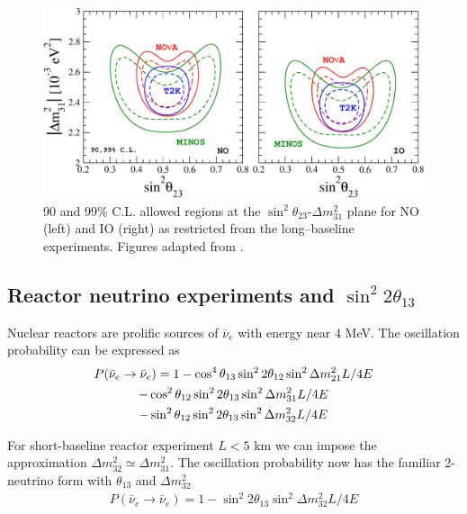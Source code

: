 \documentclass[english]{article}
\begin{document}
    \begin{figure}[!hbt]
		\begin{center}
        \centering
        \captionsetup{justification=centering}
		\includegraphics[scale=0.5]{LBL-exp.pdf}
		\caption{90 and 99\% C.L. allowed regions at the $\sin^{2}{\theta_{23}}$-$\Delta{m^{2}_{31}}$ plane for NO (left) and IO (right) as restricted from the long–baseline experiments. Figures adapted from \cite{salas2018}.}
		\label{fig:LBL-exp}
		\end{center}
	\end{figure}

\subsection{Reactor neutrino experiments and $\sin^{2}{2\theta_{13}}$}
	
    Nuclear reactors are prolific sources of $\bar{\nu}_{e}$ with energy near 4 MeV. The oscillation probability can be expressed as
    \begin{gather}
    	P(\bar{\nu}_{e} \rightarrow \bar{\nu}_{e}) = 1-\cos^{4}{\theta_{13}} \sin^{2}{2\theta_{12}} \sin^{2}{\Delta{m^{2}_{21} L/4E}}\notag \\
        -\cos^{2}{\theta_{12}} \sin^{2}{2\theta_{13}} \sin^{2}{\Delta{m^{2}_{31} L/4E}}\notag \\
        -\sin^{2}{\theta_{12}} \sin^{2}{2\theta_{13}} \sin^{2}{\Delta{m^{2}_{32} L/4E}}
    \end{gather}
    
    For short-baseline reactor experiment $L<5$ km we can impose the approximation $\Delta{m^{2}_{32}} \simeq \Delta{m^{2}_{31}}$. The oscillation probability now has the familiar 2-neutrino form with $\theta_{13}$ and $\Delta{m^{2}_{32}}$
    \begin{gather}
    	P(\bar{\nu}_{e} \rightarrow \bar{\nu}_{e}) = 1-\sin^{2}{2\theta_{13}} \sin^{2}{\Delta{m^{2}_{32} L/4E}}
    \end{gather}
    
\end{document}
